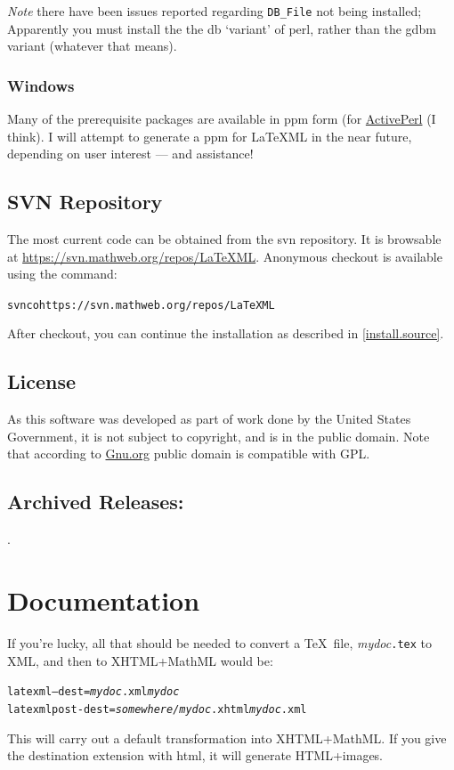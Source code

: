 \documentclass{article}
\begin{document}
\emph{Note} there have been issues reported regarding \verb|DB_File|
not being installed;  Apparently you must install the 
the db `variant' of perl, rather than the gdbm variant
(whatever that means).

\subsubsection{Windows}\label{install.windows}
Many of the prerequisite packages are available in
ppm form (for \href{http://activestate.com/}{ActivePerl} (I think).
I will attempt to generate a ppm for LaTeXML in the near
future, depending on user interest --- and assistance!

\subsection{SVN Repository}\label{download.svn}
The most current code can be obtained from the svn repository.
It is browsable at \url{https://svn.mathweb.org/repos/LaTeXML}.
Anonymous checkout is available using the command:
\begin{alltt}
  svn co https://svn.mathweb.org/repos/LaTeXML
\end{alltt}
After checkout, you can continue the installation
as described in \ref{install.source}.

\subsection{License}\label{license}
As this software was developed as part of work done by the
United States Government, it is not subject to copyright,
and is in the public domain.
Note that according to
\href{http://www.gnu.org/licences/license-list.html#PublicDomain}{Gnu.org}
public domain is compatible with GPL.

\subsection{Archived Releases:}\label{archive}
\AllReleases.

\section{Documentation}\label{docs}
If you're lucky, all that should be needed to convert
a \TeX\ file, \textit{mydoc}\texttt{.tex} to XML, and
then to XHTML+MathML would be:
\begin{alltt}
   latexml --dest=\textit{mydoc}.xml \textit{mydoc}
   latexmlpost -dest=\textit{somewhere/mydoc}.xhtml \textit{mydoc}.xml
\end{alltt}
This will carry out a default transformation into XHTML+MathML.  If you
give the destination extension with html, it will generate HTML+images.
\end{document}
